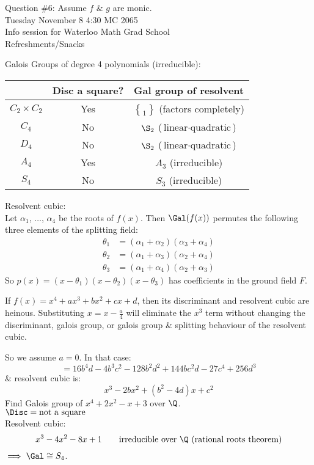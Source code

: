 Question \#6: Assume $f$ \& $g$ are monic. \\
Tuesday November 8 4:30 MC 2065 \\
Info session for Waterloo Math Grad School \\
Refreshments/Snacks

Galois Groups of degree 4 polynomials (irreducible):
\begin{center}
\begin{tabular}{c|c|c}
& Disc a square? & Gal group of resolvent \\ \hline
$C_2\times C_2$ & Yes & $\brace{1}$ (factors completely) \\
$C_4$ & No & $\S_2$ ($\text{linear}\cdot\text{quadratic}$) \\
$D_4$ & No & $\S_2$ ($\text{linear}\cdot\text{quadratic}$) \\
$A_4$ & Yes & $A_3$ (irreducible) \\
$S_4$ & No & $S_3$ (irreducible)
\end{tabular}
\end{center}
Resolvent cubic: \\
Let $\alpha_1$, $\dotsc$, $\alpha_4$ be the roots of $f(x)$.  Then $\Gal(f(x))$ permutes the following three elements of the splitting field:
\begin{align*}
\theta_1 &= (\alpha_1+\alpha_2)(\alpha_3+\alpha_4) \\
\theta_2 &= (\alpha_1+\alpha_3)(\alpha_2+\alpha_4) \\
\theta_3 &= (\alpha_1+\alpha_4)(\alpha_2+\alpha_3)
\end{align*}
So $p(x)=(x-\theta_1)(x-\theta_2)(x-\theta_3)$ has coefficients in the ground field $F$.

If $f(x)=x^4+ax^3+bx^2+cx+d$, then its discriminant and resolvent cubic are heinous.  Substituting $x=x-\frac a4$ will eliminate the $x^3$ term without changing the discriminant, galois group, or galois group \& splitting behaviour of the resolvent cubic.

So we assume $a=0$.  In that case:
\[ =16b^4d-4b^3c^2-128b^2d^2+144bc^2d-27c^4+256d^3 \]
\& resolvent cubic is:
\[ x^3 - 2b x^2 + (b^2-4d) x + c^2 \]
\eg Find Galois group of $x^4+2x^2-x+3$ over $\Q$. \\
\soln $\Disc=\text{not a square}$ \\
Resolvent cubic:
\[ x^3 -4x^2-8x+1\qquad\text{irreducible over $\Q$ (rational roots theorem)} \]
$\implies \Gal \cong S_4$.

